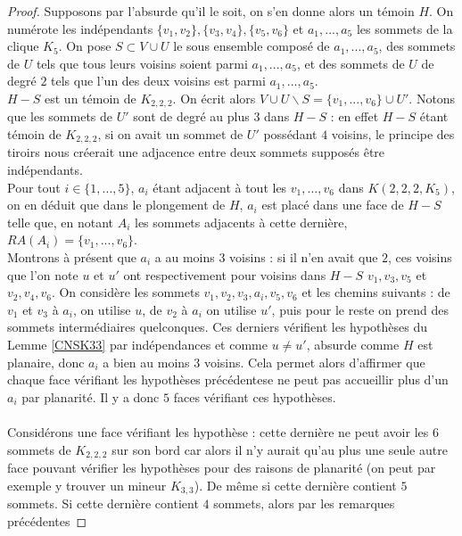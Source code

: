 \documentclass{scrartcl}
\begin{document}
\begin{flushleft}
\begin{proof}
    Supposons par l'absurde qu'il le soit, on s'en donne alors un témoin $H$. On numérote les indépendants $\{v_1, v_2\}, \{v_3, v_4\}, \{v_5, v_6\}$
    et $a_1, ..., a_5$ les sommets de la clique $K_5$. On pose $S \subset V \cup U$ le sous ensemble composé de $a_1, ..., a_5$, des sommets
    de $U$ tels que tous leurs voisins soient parmi $a_1, ..., a_5$, et des sommets de $U$ de degré $2$ tels que l'un des deux voisins
    est parmi $a_1, ..., a_5$.\\
    $H - S$ est un témoin de $K_{2,2,2}$. On écrit alors $V \cup U \backslash S = \{v_1, ..., v_6\} \cup U'$.
    Notons que les sommets de $U'$ sont de degré au plus $3$ dans $H - S$ : en effet $H-S$ étant témoin de $K_{2,2,2}$, si on avait
    un sommet de $U'$ possédant $4$ voisins, le principe des tiroirs nous créerait une adjacence entre deux sommets supposés être
    indépendants.\\
    Pour tout $i \in \{1, ..., 5\}$, $a_i$ étant adjacent à tout les $v_1, ..., v_6$ dans $K(2,2,2,K_5)$, on en déduit que dans le plongement
    de $H$, $a_i$ est placé dans une face de $H-S$ telle que, en notant $A_i$ les sommets adjacents à cette dernière, $RA(A_i) = \{v_1, ..., v_6\}$.\\
    Montrons à présent que $a_i$ a au moins $3$ voisins : si il n'en avait que $2$, ces voisins que l'on note
    $u$ et $u'$ ont respectivement pour voisins dans $H - S$ $v_1, v_3, v_5$ et $v_2, v_4, v_6$. On considère les sommets $v_1, v_2, v_3, a_i, v_5, v_6$
    et les chemins suivants : de $v_1$ et $v_3$ à $a_i$, on utilise $u$, de $v_2$ à $a_i$ on utilise $u'$, puis pour le reste on prend des sommets
    intermédiaires quelconques. Ces derniers vérifient les hypothèses du Lemme \ref{CNSK33} par indépendances et comme $u \neq u'$, absurde comme $H$
    est planaire, donc $a_i$ a bien au moins $3$ voisins. Cela permet alors d'affirmer que chaque face vérifiant les hypothèses précédentese
    ne peut pas accueillir plus d'un $a_i$ par planarité. Il y a donc $5$ faces vérifiant ces hypothèses.
    \\~\\
    Considérons une face vérifiant les hypothèse : cette dernière ne peut avoir les $6$ sommets de $K_{2,2,2}$ sur son bord car alors il n'y aurait
    qu'au plus une seule autre face pouvant vérifier les hypothèses pour des raisons de planarité (on peut par exemple y trouver un mineur
    $K_{3,3}$). De même si cette dernière contient $5$ sommets. Si cette dernière contient $4$ sommets, alors par les remarques précédentes

\end{proof}
\end{flushleft}
\end{document}
